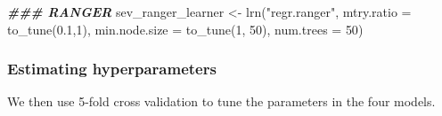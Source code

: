\documentclass[
]{article}
\newenvironment{Shaded}{\begin{snugshade}}{\end{snugshade}}
\newcommand{\AttributeTok}[1]{\textcolor[rgb]{0.77,0.63,0.00}{#1}}
\newcommand{\DecValTok}[1]{\textcolor[rgb]{0.00,0.00,0.81}{#1}}
\newcommand{\DocumentationTok}[1]{\textcolor[rgb]{0.56,0.35,0.01}{\textbf{\textit{#1}}}}
\newcommand{\FloatTok}[1]{\textcolor[rgb]{0.00,0.00,0.81}{#1}}
\newcommand{\FunctionTok}[1]{\textcolor[rgb]{0.00,0.00,0.00}{#1}}
\newcommand{\NormalTok}[1]{#1}
\newcommand{\OtherTok}[1]{\textcolor[rgb]{0.56,0.35,0.01}{#1}}
\newcommand{\StringTok}[1]{\textcolor[rgb]{0.31,0.60,0.02}{#1}}
\begin{document}
\begin{Shaded}
\begin{Highlighting}[]
\DocumentationTok{\#\#\# RANGER}
\NormalTok{sev\_ranger\_learner }\OtherTok{\textless{}{-}} \FunctionTok{lrn}\NormalTok{(}\StringTok{"regr.ranger"}\NormalTok{, }
                      \AttributeTok{mtry.ratio =} \FunctionTok{to\_tune}\NormalTok{(}\FloatTok{0.1}\NormalTok{,}\DecValTok{1}\NormalTok{), }
                      \AttributeTok{min.node.size =} \FunctionTok{to\_tune}\NormalTok{(}\DecValTok{1}\NormalTok{, }\DecValTok{50}\NormalTok{), }
                      \AttributeTok{num.trees =} \DecValTok{50}\NormalTok{)}
\end{Highlighting}
\end{Shaded}

\hypertarget{estimating-hyperparameters}{%
\subsubsection{Estimating
hyperparameters}\label{estimating-hyperparameters}}

We then use 5-fold cross validation to tune the parameters in the four
models.
\end{document}

